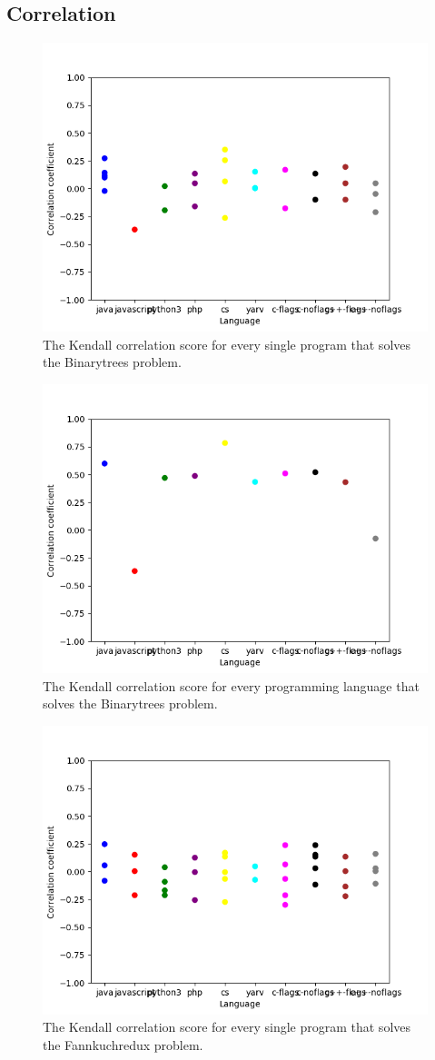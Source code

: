 \begin{appendices}
\chapter{Correlation}
\label{app:corr}

\begin{figure}[h]
    \centering
    \includegraphics[width=.6\textwidth]{graphs/kendall_Binarytrees.png}
    \caption{The Kendall correlation score for every single program that solves the Binarytrees problem.}
    \label{fig:corr-binarytrees}
\end{figure}

\begin{figure}[h]
    \centering
    \includegraphics[width=.6\textwidth]{graphs/kendall-lang_Binarytrees.png}
    \caption{The Kendall correlation score for every programming language that solves the Binarytrees problem.}
    \label{fig:corr-lang-binarytrees}
\end{figure}

\begin{figure}[h]
    \centering
    \includegraphics[width=.6\textwidth]{graphs/kendall_Fannkuchredux.png}
    \caption{The Kendall correlation score for every single program that solves the Fannkuchredux problem.}
    \label{fig:corr-fannkuchredux}
\end{figure}


\end{appendices}
